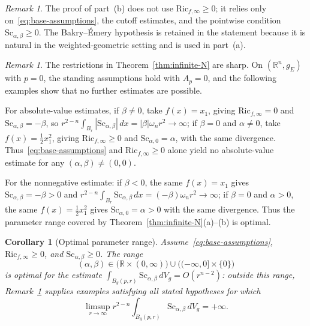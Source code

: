 \documentclass[12pt,oneside,a4paper]{article}
\theoremstyle{mytheorem}
\newtheorem{corollary}[definition]{Corollary}
\theoremstyle{remark}
\newtheorem{remark}[definition]{Remark}
\begin{document}
\begin{remark}\label{rem:redundant}
The proof of part~\textup{(b)} does not use $\mathrm{Ric}_{f,\infty}\ge 0$;
it relies only on~\eqref{eq:base-assumptions}, the cutoff estimates, and the
pointwise condition $\mathrm{Sc}_{\alpha,\beta}\ge 0$.
The Bakry--\'Emery hypothesis is retained in the statement because it is
natural in the weighted-geometric setting and is used in part~\textup{(a)}.
\end{remark}

\begin{remark}\label{rem:no-absolute-infty}
The restrictions in Theorem~\ref{thm:infinite-N} are sharp. On
$(\mathbb{R}^n,g_{E})$ with $p=0$, the standing assumptions
hold with $A_p=0$, and the following examples show that no further estimates
are possible.

For  absolute-value estimates, if $\beta\ne 0$, take $f(x)=x_1$, giving
$\mathrm{Ric}_{f,\infty}=0$ and $\mathrm{Sc}_{\alpha,\beta}=-\beta$, so
$r^{2-n}\int_{B_r}|\mathrm{Sc}_{\alpha,\beta}|\,dx=|\beta|\omega_n r^2\to\infty$;
if $\beta=0$ and $\alpha\ne 0$, take $f(x)=\tfrac{1}{2}x_1^2$, giving
$\mathrm{Ric}_{f,\infty}\ge 0$ and $\mathrm{Sc}_{\alpha,0}=\alpha$, with
the same divergence. Thus~\eqref{eq:base-assumptions} and
$\mathrm{Ric}_{f,\infty}\ge 0$ alone yield no absolute-value estimate for
any $(\alpha,\beta)\ne(0,0)$.

For the nonnegative estimate: if $\beta<0$, the same $f(x)=x_1$ gives
$\mathrm{Sc}_{\alpha,\beta}=-\beta>0$ and
$r^{2-n}\int_{B_r}\mathrm{Sc}_{\alpha,\beta}\,dx=(-\beta)\omega_n r^2\to\infty$;
if $\beta=0$ and $\alpha>0$, the same $f(x)=\tfrac{1}{2}x_1^2$ gives
$\mathrm{Sc}_{\alpha,0}=\alpha>0$ with the same divergence. Thus the parameter range covered by Theorem~\ref{thm:infinite-N}\textup{(a)}--\textup{(b)} is optimal.
\end{remark}

\begin{corollary}[Optimal parameter range]\label{cor:sharp-range-infty}
Assume~\eqref{eq:base-assumptions}, $\mathrm{Ric}_{f,\infty}\ge 0$, and
$\mathrm{Sc}_{\alpha,\beta}\ge 0$. The range
\[
  (\alpha,\beta)\in
  \bigl(\mathbb{R}\times(0,\infty)\bigr)
  \cup
  \bigl((-\infty,0]\times\{0\}\bigr)
\]
is optimal for the estimate $\int_{B_g(p,r)}\mathrm{Sc}_{\alpha,\beta}\,dV_g=O(r^{n-2})$:
outside this range, Remark~\ref{rem:no-absolute-infty} supplies examples
satisfying all stated hypotheses for which
\[
  \limsup_{r\to\infty}r^{2-n}
  \int_{B_g(p,r)}\mathrm{Sc}_{\alpha,\beta}\,dV_g=+\infty.
\]
\end{corollary}
\end{document}
